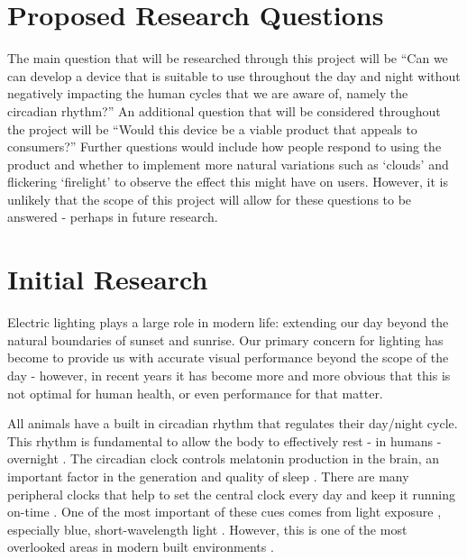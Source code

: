 \documentclass[twoside,twocolumn]{article}
\begin{document}

\section{Proposed Research Questions}
\label{sec:questions}

The main question that will  be researched through this project will be ``Can we can develop a device that is suitable to use throughout the day and night without negatively impacting the human cycles that we are aware of, namely the circadian rhythm?'' An additional question that will be considered throughout the project will be ``Would this device be a viable product that appeals to consumers?'' Further questions would include how people respond to using the product and whether to implement more natural variations such as `clouds' and flickering `firelight' to observe the effect this might have on users. However, it is unlikely that the scope of this project will allow for these questions to be answered - perhaps in future research.


\section{Initial Research}
\label{sec:research}

Electric lighting plays a large role in modern life: extending our day beyond the natural boundaries of sunset and sunrise. Our primary concern for lighting has become to provide us with accurate visual performance beyond the scope of the day - however, in recent years it has become more and more obvious that this is not optimal for human health, or even performance for that matter. 

All animals have a built in circadian rhythm that regulates their day/night cycle. This rhythm is fundamental to allow the body to effectively rest - in humans - overnight \citep{senthilnathanCircadianRhythmIts2019}. The circadian clock controls melatonin production in the brain, an important factor in the generation and quality of sleep \citep{arendtImportanceRelevanceMelatonin2003}. There are many peripheral clocks that help to set the central clock every day and keep it running on-time \citep{mohawkCentralPeripheralCircadian2012, richardsAdvancesUnderstandingPeripheral2012}. One of the most important of these cues comes from light exposure \citep{czeislerBrightLightResets1986, laaksoOnehourExposureModerate1993}, especially blue, short-wavelength light \citep{thapanActionSpectrumMelatonin2001, figueiroTrainBlueLight2013}. However, this is one of the most overlooked areas in modern built environments \citep{webbConsiderationsLightingBuilt2006}.
\end{document}
